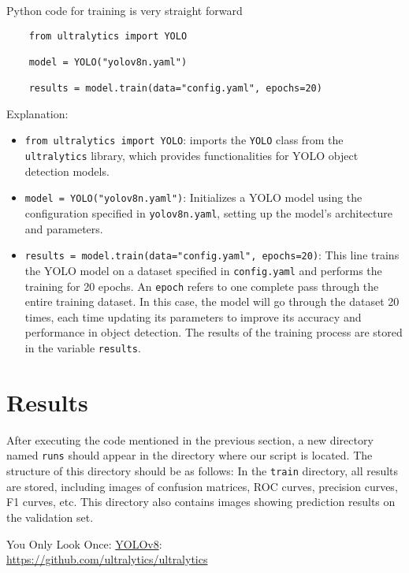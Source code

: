 \documentclass[12pt,a4paper]{article}
\begin{document}
Python code for training is very straight forward

\begin{verbatim}
    from ultralytics import YOLO

    model = YOLO("yolov8n.yaml")  
    
    results = model.train(data="config.yaml", epochs=20) 
\end{verbatim}

Explanation:
\begin{itemize}
    \item \verb|from ultralytics import YOLO|: imports the \verb|YOLO| class from the \verb|ultralytics| library, which provides functionalities for YOLO object detection models.
    \item \verb|model = YOLO("yolov8n.yaml")|: Initializes a YOLO model using the configuration specified in \verb|yolov8n.yaml|, setting up the model's architecture and parameters.
    \item \verb|results = model.train(data="config.yaml", epochs=20)|: This line trains the YOLO model on a dataset specified in \verb|config.yaml| and performs the training for 20 epochs. An \verb|epoch| refers to one complete pass through the entire training dataset. In this case, the model will go through the dataset 20 times, each time updating its parameters to improve its accuracy and performance in object detection. The results of the training process are stored in the variable \verb|results|.
\end{itemize}

\section{Results}

After executing the code mentioned in the previous section, a new directory named \verb|runs| should appear in the directory where our script is located. The structure of this directory should be as follows:
{}
In the  \verb|train| directory, all results are stored, including images of confusion matrices, ROC curves, precision curves, F1 curves, etc. This directory also contains images showing prediction results on the validation set.
\begin{thebibliography}{9}

        You Only Look Once: \href{https://github.com/ultralytics/ultralytics}{YOLOv8}: \\
        {\footnotesize \url{https://github.com/ultralytics/ultralytics}}


    \end{thebibliography}
\end{document}
